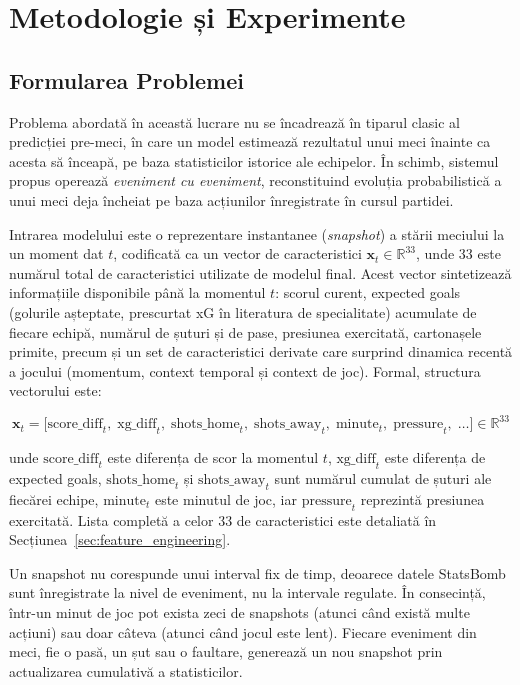 \chapter{Metodologie și Experimente}
\label{cap:metodologie}

\section{Formularea Problemei}
\label{sec:formulare}

Problema abordată în această lucrare nu se încadrează în tiparul clasic
al predicției pre-meci, în care un model estimează rezultatul unui meci
înainte ca acesta să înceapă, pe baza statisticilor istorice ale echipelor.
În schimb, sistemul propus operează \textit{eveniment cu eveniment},
reconstituind evoluția probabilistică a unui meci deja încheiat pe baza
acțiunilor înregistrate în cursul partidei.

Intrarea modelului este o reprezentare instantanee (\textit{snapshot}) a
stării meciului la un moment dat $t$, codificată ca un vector de
caracteristici $\mathbf{x}_t \in \mathbb{R}^{33}$, unde $33$ este numărul
total de caracteristici utilizate de modelul final. Acest vector
sintetizează informațiile disponibile până la momentul $t$: scorul curent,
expected goals (golurile așteptate, prescurtat xG în literatura de
specialitate) acumulate de fiecare echipă, numărul de șuturi și de pase,
presiunea exercitată, cartonașele primite, precum și un set de
caracteristici derivate care surprind dinamica recentă a jocului
(momentum, context temporal și context de joc). Formal, structura
vectorului este:

\begin{equation}
    \mathbf{x}_t = \bigl[
        \text{score\_diff}_t,\;
        \text{xg\_diff}_t,\;
        \text{shots\_home}_t,\;
        \text{shots\_away}_t,\;
        \text{minute}_t,\;
        \text{pressure}_t,\;
        \ldots
    \bigr] \in \mathbb{R}^{33}
\end{equation}

unde $\text{score\_diff}_t$ este diferența de scor la momentul $t$,
$\text{xg\_diff}_t$ este diferența de expected goals, $\text{shots\_home}_t$
și $\text{shots\_away}_t$ sunt numărul cumulat de șuturi ale fiecărei
echipe, $\text{minute}_t$ este minutul de joc, iar $\text{pressure}_t$
reprezintă presiunea exercitată. Lista completă a celor 33 de
caracteristici este detaliată în Secțiunea~\ref{sec:feature_engineering}.

Un snapshot nu corespunde unui interval fix de timp, deoarece datele
StatsBomb sunt înregistrate la nivel de eveniment, nu la intervale
regulate. În consecință, într-un minut de joc pot exista zeci de snapshots
(atunci când există multe acțiuni) sau doar câteva (atunci când jocul este
lent). Fiecare eveniment din meci, fie o pasă, un șut sau o faultare,
generează un nou snapshot prin actualizarea cumulativă a statisticilor.

